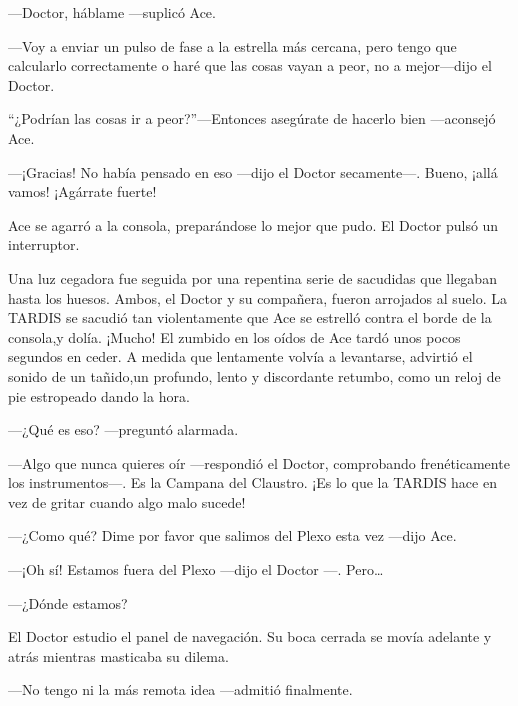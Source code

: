 ---Doctor, háblame ---suplicó Ace.

---Voy a enviar un pulso de fase a la estrella más cercana, pero
tengo que calcularlo correctamente o haré que las cosas vayan a peor, no
a mejor---dijo el Doctor.

``¿Podrían las cosas ir a peor?''---Entonces asegúrate de
hacerlo bien ---aconsejó Ace.

---¡Gracias! No había pensado en eso ---dijo el Doctor
secamente---. Bueno, ¡allá vamos! ¡Agárrate fuerte!

Ace se agarró a la consola, preparándose lo mejor que pudo. El
Doctor pulsó un interruptor.

Una luz cegadora fue seguida por una repentina serie de
sacudidas que llegaban hasta los huesos. Ambos, el Doctor y su
compañera, fueron arrojados al suelo. La TARDIS se sacudió tan
violentamente que Ace se estrelló contra el borde de la consola,y
dolía. ¡Mucho! El zumbido en los oídos de Ace tardó unos pocos segundos
en ceder. A medida que lentamente volvía a levantarse, advirtió el
sonido de un tañido,un profundo, lento y discordante retumbo, como un
reloj de pie estropeado dando la hora.

---¿Qué es eso? ---preguntó alarmada.

---Algo que nunca quieres oír ---respondió el Doctor,
comprobando frenéticamente los instrumentos---. Es la Campana del
Claustro. ¡Es lo que la TARDIS hace en vez de gritar cuando algo malo
sucede!

---¿Como qué? Dime por favor que salimos del Plexo esta vez
---dijo Ace.

---¡Oh sí! Estamos fuera del Plexo ---dijo el Doctor ---.
Pero\ldots{}

---¿Dónde estamos?

El Doctor estudio el panel de navegación. Su boca cerrada se
movía adelante y atrás mientras masticaba su dilema.

---No tengo ni la más remota idea ---admitió finalmente.